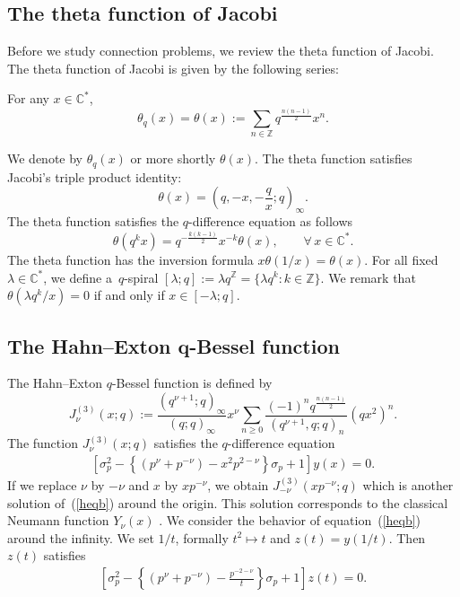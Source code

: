 \documentclass[pdftex]{sigma}
\begin{document}
\subsection{The theta function of Jacobi}\label{section2.1}
Before we study connection problems, we review the theta function of Jacobi. The theta function of Jacobi is given by the following series:
\begin{definition}For any $x\in\mathbb{C}^*$,
\[
\theta_q(x)=\theta (x):=\sum_{n\in\mathbb{Z}}q^{\frac{n(n-1)}{2}}x^n.
\]
\end{definition}
We denote by $\theta_q(x)$ or more shortly $\theta (x)$. The theta function satisf\/ies Jacobi's triple product identity:
\[
\theta (x)=\left(q,-x,-\frac{q}{x};q\right)_\infty .
\]
The theta function satisf\/ies the $q$-dif\/ference equation as follows
\[
\theta (q^kx)=q^{-\frac{k(k-1)}{2}}x^{-k}\theta (x),\qquad \forall \, x\in\mathbb{C}^*.
\]
The theta function has the inversion formula
$x\theta(1/x)=\theta (x)$. For all f\/ixed $\lambda\in\mathbb{C}^*$, we def\/ine a~$q$-spiral $[\lambda ;q]:=\lambda q^{\mathbb{Z}}=\{\lambda q^k:k\in\mathbb{Z}\}$.
We remark that $\theta \left(\lambda q^k/x\right)=0$ if and only if $x\in [-\lambda ;q]$.

\subsection[The Hahn-Exton $q$-Bessel function]{The Hahn--Exton $\boldsymbol{q}$-Bessel function}\label{section2.2}

The Hahn--Exton $q$-Bessel function is def\/ined by
\[
J_\nu^{(3)}(x;q):=\frac{(q^{\nu +1};q)_\infty}{(q;q)_\infty}x^\nu\sum_{n\ge 0}\frac{(-1)^nq^{\frac{n(n-1)}{2}}}{(q^{\nu +1},q;q)_n}\left(qx^2\right)^n.
\]
The function $J_\nu^{(3)}(x;q)$ satisf\/ies the $q$-dif\/ference equation
\begin{gather}\label{heqb}
\left[\sigma_p^2- \left\{(p^\nu +p^{-\nu })-x^2p^{2-\nu}\right\}\sigma_p +1\right]y(x)=0.
\end{gather}
If we replace $\nu$ by $-\nu$ and $x$ by $xp^{-\nu}$,
we obtain $J_{-\nu}^{(3)}(xp^{-\nu};q)$ which is another solution of~(\ref{heqb}) around the origin. This solution corresponds to the classical Neumann function $Y_\nu (x)$ \cite{Z3}. We consider the behavior of equation~(\ref{heqb}) around the inf\/inity. We set $1/t$, formally $t^2\mapsto t$ and $z(t)=y(1/t)$. Then $z(t)$ satisf\/ies
\begin{gather}
\left[\sigma_p^2-\left\{(p^\nu +p^{-\nu})-\frac{p^{-2-\nu }}{t}\right\}\sigma_p+1\right]z\left(t\right)=0.
\label{b3}
\end{gather}
\end{document}
